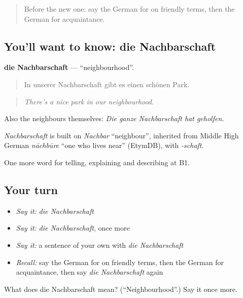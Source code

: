 \begin{quote}
Before the new one: say the German for on friendly terms, then the German for acquaintance.
\end{quote}

\subsection*{You'll want to know: die Nachbarschaft}
\textbf{die Nachbarschaft} — \textquotedblleft{}neighbourhood\textquotedblright{}.

\begin{quote}
In unserer Nachbarschaft gibt es einen schönen Park.
\end{quote}

\begin{quote}
\emph{There's a nice park in our neighbourhood.}
\end{quote}

Also the neighbours themselves: \emph{Die ganze Nachbarschaft hat geholfen.}

\begin{cousinweb}
\emph{Nachbarschaft} is built on \emph{Nachbar} \textquotedblleft{}neighbour\textquotedblright{}, inherited from Middle High German \emph{nāchbūre} \textquotedblleft{}one who lives near\textquotedblright{} (EtymDB), with \emph{-schaft}.
\end{cousinweb}

\begin{grammarlens}[title={What you've built}]
One more word for telling, explaining and describing at B1.
\end{grammarlens}

\subsection*{Your turn}
\begin{itemize}
\raggedright
  \item \emph{Say it:} \emph{die Nachbarschaft}
  \item \emph{Say it:} \emph{die Nachbarschaft}, once more
  \item \emph{Say it:} a sentence of your own with \emph{die Nachbarschaft}
  \item \emph{Recall:} say the German for on friendly terms, then the German for acquaintance, then say \emph{die Nachbarschaft} again
\end{itemize}

\begin{tcolorbox}[breakable,colback=teal!4,colframe=teal!35!black,title={Before you move on}]
What does die Nachbarschaft mean? (\textquotedblleft{}Neighbourhood\textquotedblright{}.) Say it once more.
\end{tcolorbox}
